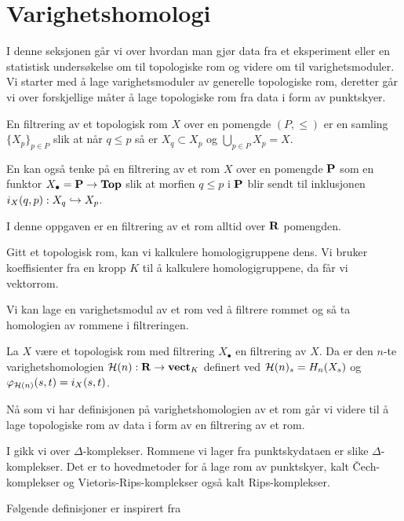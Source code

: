 \section{Varighetshomologi}\label{sek:VarHom}
I denne seksjonen går vi over hvordan man gjør data fra et
eksperiment eller en statistisk undersøkelse om til topologiske
rom og videre om til varighetsmoduler. Vi starter med å lage
varighetsmoduler av generelle topologiske rom, deretter går vi
over forskjellige måter å lage topologiske rom fra data i form av
punktskyer.

\begin{definisjon}\label{def:FiltTop}
En filtrering av et topologisk rom $X$ over en pomengde $(P,\leq)$
er en samling $\{X_p\}_{p\in P}$ slik at når $q\leq p$ så er
  $X_q\subset X_p$ og $\bigcup_{p\in P} X_p = X$.
\end{definisjon}

En kan også tenke på en filtrering av et rom $X$ over en pomengde
$\textnormal{\textbf{{P}}}$ som en funktor $X_\bullet = \textnormal{\textbf{{P}}}\to\textnormal{\textbf{Top}}$ slik at morfien
$q\leq p$ i $\textnormal{\textbf{{P}}}$ blir sendt til inklusjonen $i_X(q,p):
X_q\hookrightarrow X_p$.

I denne oppgaven er en filtrering av et rom alltid over $\textnormal{\textbf{{R}}}$
pomengden.

Gitt et topologisk rom, kan vi kalkulere homologigruppene dens.
Vi bruker koeffisienter fra en kropp $K$ til å kalkulere
homologigruppene, da får vi vektorrom.

Vi kan lage en varighetsmodul av et rom ved å filtrere rommet og
så ta homologien av rommene i filtreringen.

\begin{definisjon}\label{def:VarHom}
  La $X$ være et topologisk rom med filtrering $X_\bullet$ en
  filtrering av $X$. Da er den $n$-te varighetshomologien $\mathcal{H}(n):
  \textnormal{\textbf{{R}}}\to\textnormal{\textbf{vect}}_K$ definert ved $\mathcal{H}(n)_s = H_n(X_s)$ og
  $\varphi_{\mathcal{H}(n)}(s,t) = i_X(s,t)$.
\end{definisjon}

Nå som vi har definisjonen på varighetshomologien av et rom går vi
videre til å lage topologiske rom av data i form av en filtrering
av et rom.

I  gikk vi over
$\Delta$-komplekser. Rommene vi lager fra punktskydataen er slike
$\Delta$-komplekser. Det er to hovedmetoder for å lage rom av
punktskyer, kalt Čech-komplekser og Vietoris-Rips-komplekser også
kalt Rips-komplekser.

Følgende definisjoner er inspirert fra \cite{Schenck2022}

